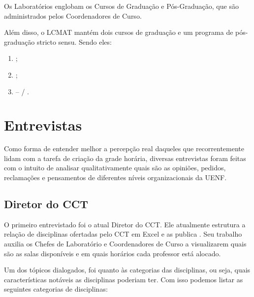 Os Laboratórios englobam os Cursos de Graduação e Pós-Graduação, que são administrados pelos Coordenadores de Curso.

Além disso, o LCMAT mantém dois cursos de graduação e um programa de pós-graduação stricto sensu. Sendo eles:

\begin{enumerate}
  \item {};
  \item {};
  \item {} –  / .
\end{enumerate}

\section{Entrevistas} \label{sec:entrevistas} %


Como forma de entender melhor a percepção real daqueles que recorrentemente lidam com a tarefa de criação da grade horária, diversas entrevistas foram feitas com o intuito de analisar qualitativamente quais são as opiniões, pedidos, reclamações e pensamentos de diferentes níveis organizacionais da UENF.

\subsection{Diretor do CCT} %


O primeiro entrevistado foi o atual Diretor do CCT. Ele atualmente estrutura a relação de disciplinas ofertadas pelo CCT em Excel e as publica . Seu trabalho auxilia os Chefes de Laboratório e Coordenadores de Curso a visualizarem quais são as salas disponíveis e em quais horários cada professor está alocado.

Um dos tópicos dialogados, foi quanto às categorias das disciplinas, ou seja, quais características notáveis as disciplinas poderiam ter. Com isso podemos listar as seguintes categorias de disciplinas:


